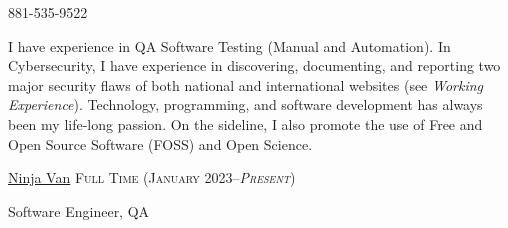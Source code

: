 \documentclass[11pt,a4paper]{article} %
\begin{document}


\noindent\bull{}

\noindent\bull{} 881-535-9522 %

\noindent\bull{}



\noindent I have experience in QA Software Testing (Manual and Automation). In Cybersecurity, I have experience in discovering, documenting, and reporting two
major security flaws of both national and international websites (see \textit{Working Experience}). Technology, programming, and software development has always been my life-long passion.
On the sideline, I also promote the use of Free and Open Source Software (FOSS) and Open Science.

\vspace{-1em} %




\headedsection %
{\href{https://www.ninjavan.co/}{Ninja Van}}
{\dotfill\textsc{Full Time (January 2023--\textit{Present})}} {

    \headedsubsection %
    { Software Engineer, QA}
    {}
    {}
}
\end{document}
